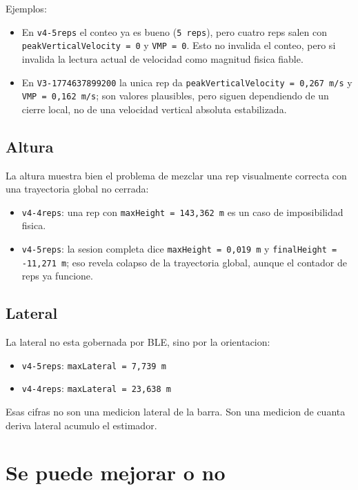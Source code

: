 \documentclass[11pt,a4paper]{article}
\begin{document}
Ejemplos:
\begin{itemize}[leftmargin=14pt]
  \item En \texttt{v4-5reps} el conteo ya es bueno (\texttt{5 reps}), pero cuatro reps salen con \texttt{peakVerticalVelocity = 0} y \texttt{VMP = 0}. Esto no invalida el conteo, pero si invalida la lectura actual de velocidad como magnitud fisica fiable.
  \item En \texttt{V3-1774637899200} la unica rep da \texttt{peakVerticalVelocity = 0,267 m/s} y \texttt{VMP = 0,162 m/s}; son valores plausibles, pero siguen dependiendo de un cierre local, no de una velocidad vertical absoluta estabilizada.
\end{itemize}

\subsection*{Altura}
La altura muestra bien el problema de mezclar una rep visualmente correcta con una trayectoria global no cerrada:
\begin{itemize}[leftmargin=14pt]
  \item \texttt{v4-4reps}: una rep con \texttt{maxHeight = 143,362 m} es un caso de imposibilidad fisica.
  \item \texttt{v4-5reps}: la sesion completa dice \texttt{maxHeight = 0,019 m} y \texttt{finalHeight = -11,271 m}; eso revela colapso de la trayectoria global, aunque el contador de reps ya funcione.
\end{itemize}

\subsection*{Lateral}
La lateral no esta gobernada por BLE, sino por la orientacion:
\begin{itemize}[leftmargin=14pt]
  \item \texttt{v4-5reps}: \texttt{maxLateral = 7,739 m}
  \item \texttt{v4-4reps}: \texttt{maxLateral = 23,638 m}
\end{itemize}
Esas cifras no son una medicion lateral de la barra. Son una medicion de cuanta deriva lateral acumulo el estimador.

\section{Se puede mejorar o no}
\end{document}
